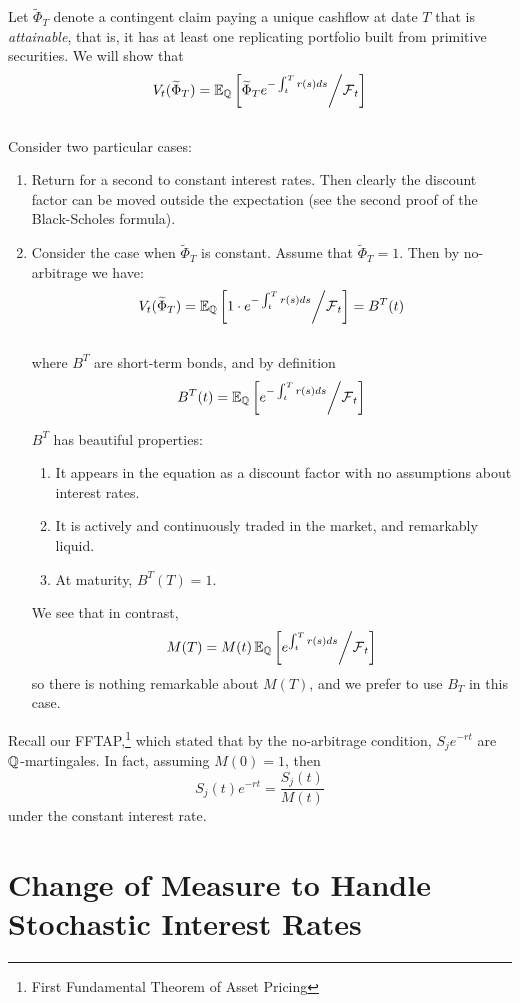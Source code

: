 \documentclass[11pt]{article}
\begin{document}
Let $\widetilde{\Phi}_T$ denote a contingent claim paying a unique cashflow at date $T$ that is {\em attainable}, that is, it has at least one replicating portfolio built from primitive securities. We will show that 
$$ V_t(\widetilde{\Phi}_T) = \operatorname{\mathbb E}_{\operatorname{\mathbb Q}} \left[ \widetilde{\Phi}_T e^{-\int_t^T r(s) ds} \middle/ \operatorname{\mathcal F}_t \right]$$\\

Consider two particular cases:
\begin{enumerate}
\item Return for a second to constant interest rates. Then clearly the discount factor can be moved outside the expectation (see the second proof of the Black-Scholes formula).
\item Consider the case when $\widetilde{\Phi}_T$ is constant. Assume that $\widetilde{\Phi}_T = 1$. Then by no-arbitrage we have:
$$ V_t(\widetilde{\Phi}_T) = \operatorname{\mathbb E}_{\operatorname{\mathbb Q}} \left[ 1 \cdot e^{-\int_t^T r(s) ds} \middle/ \operatorname{\mathcal F}_t \right] = B^T(t)$$\\
where $B^T$ are short-term bonds, and by definition
$$B^T(t) = \operatorname{\mathbb E}_{\operatorname{\mathbb Q}} \left[ e^{-\int_t^T r(s) ds} \middle/ \operatorname{\mathcal F}_t \right]$$

$B^T$ has beautiful properties: 
\begin{enumerate}
\item It appears in the equation as a discount factor with no assumptions about interest rates. 
\item It is actively and continuously traded in the market, and remarkably liquid.
\item At maturity, $B^T(T) = 1$.
\end{enumerate}
We see that in contrast,
$$M(T) = M(t)\operatorname{\mathbb E}_{\operatorname{\mathbb Q}} \left[ e^{\int_t^T r(s) ds} \middle/ \operatorname{\mathcal F}_t \right]$$
so there is nothing remarkable about $M(T)$, and we prefer to use $B_T$ in this case. \\
\end{enumerate}

Recall our FFTAP,\footnote{First Fundamental Theorem of Asset Pricing} which stated that by the no-arbitrage condition, $S_je^{-rt}$ are $\operatorname{\mathbb Q}$-martingales. In fact, assuming $M(0) = 1$, then
$$ S_j(t)e^{-rt} = \frac{S_j(t)}{M(t)}$$
under the constant interest rate.

\section{Change of Measure to Handle Stochastic Interest Rates}
\end{document}
